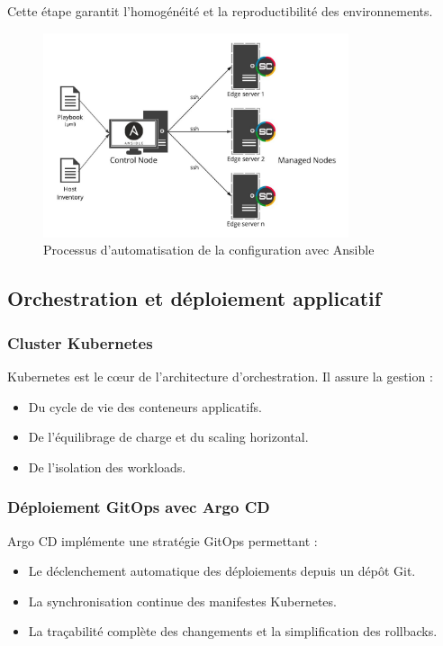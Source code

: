 Cette étape garantit l’homogénéité et la reproductibilité des environnements.

\begin{figure}[H]
	\centering
	\includegraphics[width=0.8\textwidth]{figures/ansible-configuration.png}
	\caption{Processus d'automatisation de la configuration avec Ansible}
\end{figure}

\subsection{Orchestration et déploiement applicatif}

\subsubsection*{Cluster Kubernetes}

Kubernetes est le cœur de l’architecture d’orchestration. Il assure la gestion :
\begin{itemize}
	\item Du cycle de vie des conteneurs applicatifs.
	\item De l’équilibrage de charge et du scaling horizontal.
	\item De l’isolation des workloads.
\end{itemize}

\subsubsection*{Déploiement GitOps avec Argo CD}

Argo CD implémente une stratégie GitOps permettant :
\begin{itemize}
	\item Le déclenchement automatique des déploiements depuis un dépôt Git.
	\item La synchronisation continue des manifestes Kubernetes.
	\item La traçabilité complète des changements et la simplification des rollbacks.
\end{itemize}

